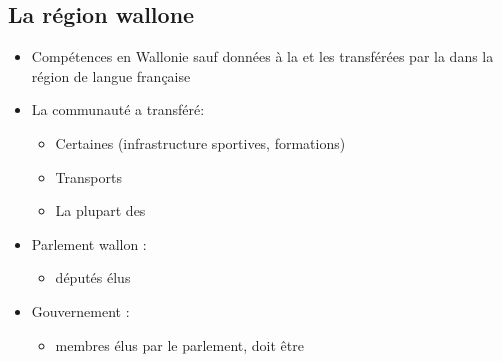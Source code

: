 \subsection{La région wallone}
\begin{itemize}
	\item Compétences  en Wallonie sauf  données à la  et les  transférées par la  dans la région de langue française
	\item La communauté a transféré:
	\begin{itemize}
		\item Certaines  (infrastructure sportives, formations)
		\item Transports 
		\item La plupart des 
	\end{itemize}
	\item Parlement wallon :
	\begin{itemize}
		\item {} députés élus
	\end{itemize}
	\item Gouvernement :
	\begin{itemize}
		\item {} membres  élus par le parlement, doit être 
	\end{itemize}
\end{itemize}

